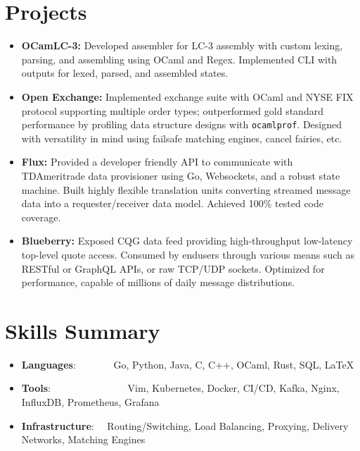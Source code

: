 \documentclass[a4paper,11pt]{extarticle}
\newcommand{\resumeSkillItem}[2]{
	\item\small{
		\textbf{#1}{: #2 \vspace{-2pt}}
	}
}
\newcommand{\resumeSubItem}[2]{\resumeSkillItem{#1}{#2}\vspace{-5pt}}
\newcommand{\resumeSubHeadingListStart}{
    \begin{itemize}[leftmargin=0.15in,label={}]}
\newcommand{\resumeSubHeadingListEnd}{\end{itemize}}
\begin{document}
\section{Projects}
    \noindent
    \begin{itemize}
        \vspace{-1.5mm}
        \item{\textbf{OCamLC-3:} Developed assembler for LC-3 assembly with
                custom lexing, parsing, and assembling using OCaml and Regex.
                Implemented CLI with outputs for lexed, parsed, and
                assembled states.
        }
        \vspace{-1mm}
        \item{\textbf{Open Exchange:} Implemented exchange suite with OCaml 
                and NYSE FIX protocol supporting multiple order types;
                outperformed gold standard performance by profiling data
                structure designs with \texttt{ocamlprof}. Designed with
                versatility in mind using failsafe matching engines, cancel
                fairies, etc.
        }
        \vspace{-1mm}
        \item{\textbf{Flux:} Provided a developer friendly API to communicate
                with TDAmeritrade data provisioner using Go, Websockets, and
                a robust state machine. Built highly flexible translation units
                converting streamed message data into a requester/receiver 
                data model. Achieved 100\% tested code coverage.
        }
        \vspace{-1mm}
        \item{\textbf{Blueberry:} Exposed CQG data feed providing
            high-throughput low-latency top-level quote access. Consumed
            by endusers through various means such as RESTful or GraphQL APIs,
            or raw TCP/UDP sockets. Optimized for performance, capable of
            millions of daily message distributions.
        }
    \end{itemize}

\section{Skills Summary}
	\resumeSubHeadingListStart
		\resumeSubItem{Languages}
			{\hspace{0.6mm}~~~~~~~Go, Python, Java, C, C++, OCaml, Rust, SQL,
                \LaTeX}
		\resumeSubItem{Tools}
            {\hspace{0.3mm}~~~~~~~~~~~~~~~Vim, Kubernetes, Docker, CI/CD,
                Kafka, Nginx, InfluxDB, Prometheus, Grafana}
		\resumeSubItem{Infrastructure}
			{~~Routing/Switching, Load Balancing, Proxying, Delivery Networks,
                 Matching Engines}

        \begin{comment}
		\resumeSubItem{Finance}
			{\hspace{0.7mm}~~~~~~~~~~~Futures, Options, Stochastics, Hypothesis
				Testing, Commodities, Volatility}
        \end{comment}


	\resumeSubHeadingListEnd
\end{document}

